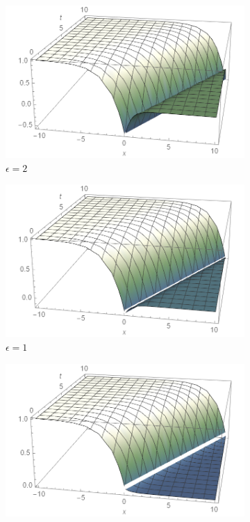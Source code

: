 \documentclass[12pt]{article}
\begin{document}
\begin{figure}[H]
    \centering
    \begin{subfigure}[h]{0.4\textwidth}
        \includegraphics[width=\textwidth]{Part2Plots/e2}
        \caption{$\epsilon=2$}
        \label{fig:t0}
    \end{subfigure}
    \begin{subfigure}[h]{0.4\textwidth}
        \includegraphics[width=\textwidth]{Part2Plots/e1}
        \caption{$\epsilon=1$}
        \label{fig:t1}
    \end{subfigure}
    \begin{subfigure}[h]{0.4\textwidth}
        \includegraphics[width=\textwidth]{Part2Plots/e05}

\end{subfigure}
\end{figure}
\end{document}
